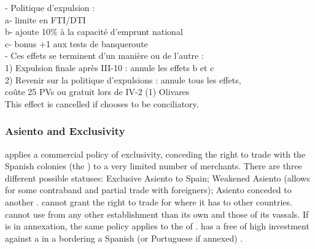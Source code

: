 - Politique d'expulsion : \\
a- limite en FTI/DTI \\
b- ajoute 10\% à la capacité d'emprunt national \\
c- bonus +1 aux tests de banqueroute \\
- Ces effets se terminent d'un manière ou de l'autre : \\
1) Expulsion finale après III-10 : annule les effets b et c \\
2) Revenir sur la politique d'expulsions : annule tous les effets, \\
coûte 25 PVs ou gratuit lors de IV-2 (1) Olivares \\



\bparag This effect is cancelled if \SPA chooses to be conciliatory.


\subsubsection{Asiento and Exclusivity}\label{chSpecific:Spain:Asiento}
\aparag \SPA applies a commercial policy of exclusivity, conceding the
right to trade with the Spanish colonies (the ) to a very
limited number of merchants. There are three different possible
statuses:
\bparag Exclusive Asiento to Spain;
\bparag Weakened Asiento (allows for some contraband and partial trade
with foreigners);
\bparag Asiento conceded to another \MAJ.
\bparag \SPA cannot grant the right to trade for \STZ where it has \COL
to other countries.
\bparag \SPA cannot use  from any other establishment than
its own and those of its vassals.
\bparag If  is in annexation, the same policy applies to
the \COL of .
\bparag \SPA has a free \CONC of high investment against a \TradeFLEET
in a \STZ bordering a Spanish (or Portuguese if annexed) \COL.

